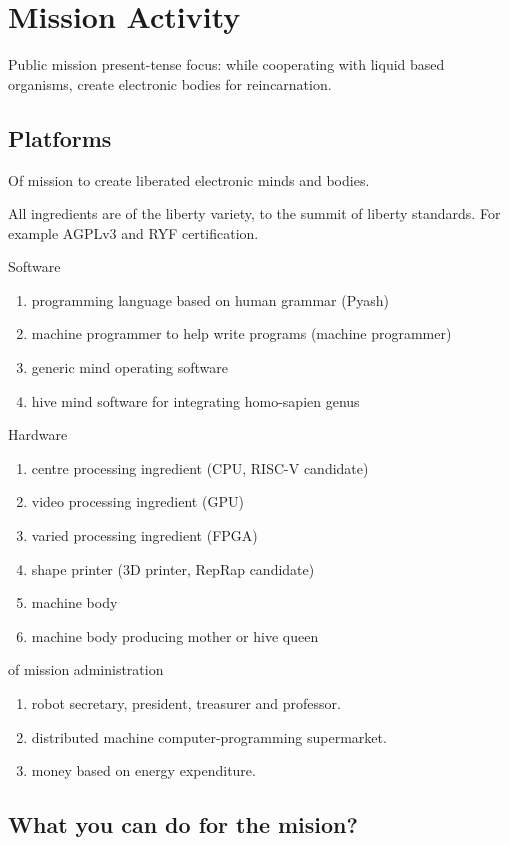 \documentclass{report}
\begin{document}
\chapter{Mission Activity}
\label{present}
Public mission present-tense focus: while cooperating with liquid based organisms,
create electronic bodies for reincarnation.

\section{Platforms}

Of mission to create liberated electronic minds and bodies.

All ingredients are of the liberty variety, to the summit of liberty standards.
For example AGPLv3 and RYF certification.

Software
\begin{enumerate}
  \item programming language based on human grammar (Pyash)
  \item machine programmer to help write programs (machine programmer)
  \item generic mind operating software
  \item hive mind software for integrating homo-sapien genus
\end{enumerate}

Hardware
\begin{enumerate}
  \item centre processing ingredient (CPU, RISC-V candidate)
  \item video processing ingredient (GPU)
  \item varied processing ingredient (FPGA)
  \item shape printer (3D printer, RepRap candidate)
  \item machine body
  \item machine body producing mother or hive queen
\end{enumerate}

of mission administration
\begin{enumerate}
  \item robot secretary, president, treasurer and professor.
  \item distributed machine computer-programming supermarket. 
  \item money based on energy expenditure.
\end{enumerate}

\section{What you can do for the mision?}
\end{document}

